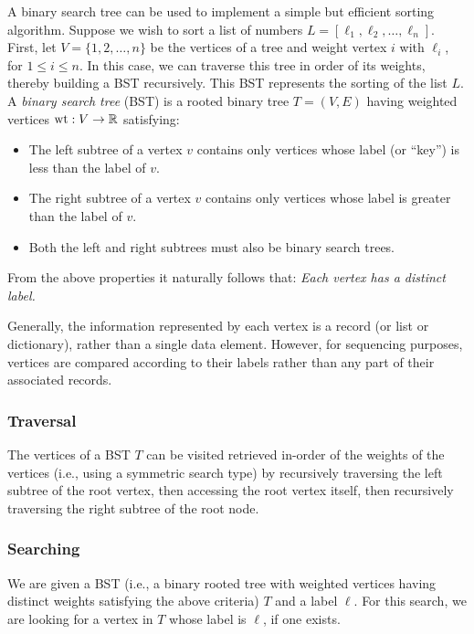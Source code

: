 A binary search tree can be used to implement a simple but efficient
sorting algorithm. Suppose we wish to sort a list of numbers
$L = [\ell_1, \ell_2,\dots, \ell_n]$. First, let $V=\{1,2,\dots,n\}$
be the vertices of a tree and weight vertex $i$ with $\ell_i$,
for $1\leq i\leq n$. In this case, we can traverse this tree
in order of its weights, thereby building a BST recursively.
This BST represents the sorting of the list $L$.
A {\it binary search tree} (BST) is a rooted binary tree
$T=(V,E)$ having weighted vertices ${\rm wt}:V\to {\mathbb{R}}$ satisfying:

\begin{itemize}
\item
 The left subtree of a vertex $v$ contains only vertices whose label
(or ``key'') is less than the label of $v$.
\item
The right subtree of a vertex $v$ contains only vertices whose label
  is greater than the label of $v$.
\item
Both the left and right subtrees must also be binary search trees.
\end{itemize}

From the above properties it naturally follows that:
{\it Each vertex has a distinct label.}

Generally, the information represented by each vertex is a
record (or list or dictionary), rather than a single data element. However,
for sequencing purposes, vertices are compared according to their
labels rather than any part of their associated records.

\subsubsection{Traversal}

The vertices of a BST $T$ can be visited retrieved in-order of the
weights of the vertices (i.e.,
using a symmetric search type) by recursively  traversing the left subtree of the
root vertex, then accessing the root vertex itself, then recursively traversing the
right subtree of the root node.

\subsubsection{Searching}

We are given a BST (i.e., a binary rooted tree with weighted vertices
having distinct weights satisfying the above criteria) $T$ and a
label $\ell$. For this search, we are looking for a vertex in $T$
whose label is $\ell$, if one exists.

